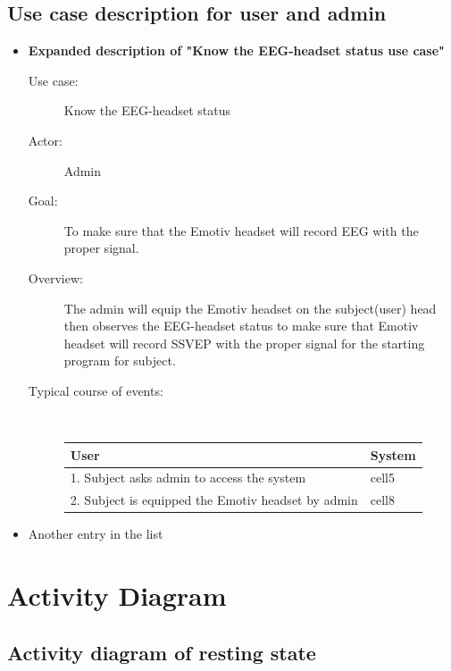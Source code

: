 \subsection{Use case description for user and admin}
\begin{itemize}
\item \textbf{Expanded description of "Know the EEG-headset status
use case" }

\begin{description}
\item [{Use case:}] Know the EEG-headset status 
\item [{Actor:}] Admin 
\item [{Goal:}] To make sure that the Emotiv headset will record EEG with
the proper signal. 
\item [{Overview:}] The admin will equip the Emotiv headset on the subject(user)
head then observes the EEG-headset status to make sure that Emotiv
headset will record SSVEP with the proper signal for the starting
program for subject. 
\item [{Typical course of events:}]~
	\centering
\begin{tabular}{ | m{8cm}| m{8cm} | }

\hline 
\textbf{User} & \textbf{System}  \tabularnewline
\hline 
1. Subject asks admin to access the system & cell5  \tabularnewline
\hline 
2. Subject is equipped the Emotiv headset by admin  & cell8  \tabularnewline
\hline 
\end{tabular}

\end{description}
\item Another entry in the list 
\end{itemize}

\section{Activity Diagram}


\subsection{Activity diagram of resting state}

